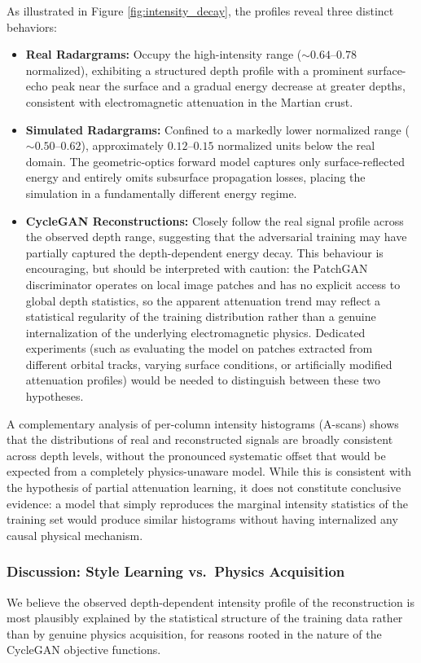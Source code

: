 As illustrated in Figure \ref{fig:intensity_decay}, the profiles reveal three distinct behaviors:
\begin{itemize}
    \item \textbf{Real Radargrams:} Occupy the high-intensity range (${\sim}0.64$--$0.78$ normalized), exhibiting a structured depth profile with a prominent surface-echo peak near the surface and a gradual energy decrease at greater depths, consistent with electromagnetic attenuation in the Martian crust.
    \item \textbf{Simulated Radargrams:} Confined to a markedly lower normalized range (${\sim}0.50$--$0.62$), approximately $0.12$--$0.15$ normalized units below the real domain. The geometric-optics forward model captures only surface-reflected energy and entirely omits subsurface propagation losses, placing the simulation in a fundamentally different energy regime.
    \item \textbf{CycleGAN Reconstructions:} Closely follow the real signal profile across the observed depth range, suggesting that the adversarial training may have partially captured the depth-dependent energy decay. This behaviour is encouraging, but should be interpreted with caution: the PatchGAN discriminator operates on local image patches and has no explicit access to global depth statistics, so the apparent attenuation trend may reflect a statistical regularity of the training distribution rather than a genuine internalization of the underlying electromagnetic physics. Dedicated experiments (such as evaluating the model on patches extracted from different orbital tracks, varying surface conditions, or artificially modified attenuation profiles) would be needed to distinguish between these two hypotheses.
\end{itemize}

A complementary analysis of per-column intensity histograms (A-scans) shows that the distributions of real and reconstructed signals are broadly consistent across depth levels, without the pronounced systematic offset that would be expected from a completely physics-unaware model.
While this is consistent with the hypothesis of partial attenuation learning, it does not constitute conclusive evidence: a model that simply reproduces the marginal intensity statistics of the training set would produce similar histograms without having internalized any causal physical mechanism.

\subsubsection{Discussion: Style Learning vs.\ Physics Acquisition}
We believe the observed depth-dependent intensity profile of the reconstruction is most plausibly explained by the statistical structure of the training data rather than by genuine physics acquisition, for reasons rooted in the nature of the CycleGAN objective functions.

